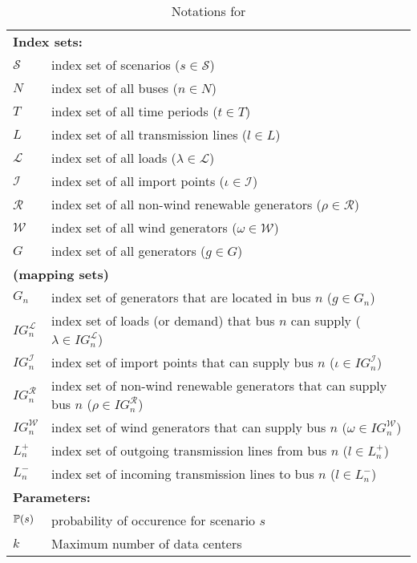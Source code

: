 \begin{table}[H]
	\centering
	\caption{Notations for \sdcp}
	\label{sdcp:notation}
	\resizebox{\textwidth}{!}
	{
		\begin{tabular}{ll}
			\toprule
			\multicolumn{2}{l}{\textbf{Index sets:}} \\
			$\mathcal{S}$ & index set of scenarios ($s\in\mathcal{S}$) 		\\ 		
			$N$ & index set of all buses ($n\in N$)\\
			$T$ & index set of all time periods ($t\in T$)\\
			$L$ & index set of all transmission lines ($l\in L$) \\
			$\mathcal{L}$ & index set of all loads ($\lambda \in \mathcal{L}$)\\
			$\mathcal{I}$ & index set of all import points ($\iota\in \mathcal{I}$)\\
			$\mathcal{R}$ & index set of all non-wind renewable generators ($\rho\in \mathcal{R}$)\\
			$\mathcal{W}$ & index set of all wind generators ($\omega\in \mathcal{W}$)\\
			$G$ & index set of all generators ($g\in G$)\\
			\multicolumn{2}{l}{\textbf{(mapping sets)}} \\
			$G_n$ & index set of generators that are located in bus $n$ ($g\in G_n$)\\
			$IG_n^\mathcal{L}$ & index set of loads (or demand) that bus $n$ can supply ($\lambda\in IG_n^\mathcal{L}$)\\
			$IG_n^\mathcal{I}$ & index set of import points that can supply bus $n$ ($\iota\in IG_n^\mathcal{I}$) \\
			$IG_n^\mathcal{R}$ & index set of non-wind renewable generators that can supply bus $n$ ($\rho\in IG_n^\mathcal{R}$) \\
			$IG_n^\mathcal{W}$ & index set of wind generators that can supply bus $n$ ($\omega\in IG_n^\mathcal{W}$)\\
			$L_n^{+}$ & index set of outgoing transmission lines from bus $n$ ($l\in L_n^+$)\\
			$L_n^{-}$ & index set of incoming transmission lines to bus $n$ ($l\in L_n^-$)\\ \midrule
			\multicolumn{2}{l}{\textbf{Parameters:}} \\
			$\operatorname*{\mathbb{P}}(s)$	&probability of occurence for scenario $s$\\
			$k$	& Maximum number of data centers \\

\end{tabular}}
\end{table}

